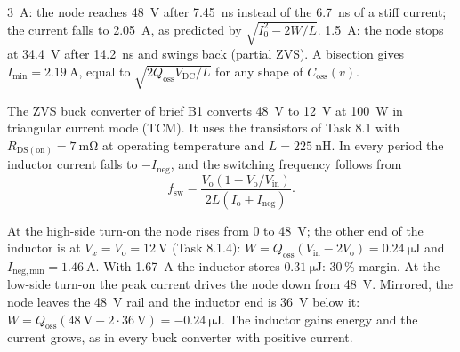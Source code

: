 \begin{solutionblock}
	\SI{3}{\ampere}: the node reaches \SI{48}{\volt} after \SI{7.45}{\nano\second} instead of the \SI{6.7}{\nano\second} of a stiff current; the current falls to \SI{2.05}{\ampere}, as predicted by $\sqrt{I_0^2-2W/L}$. \SI{1.5}{\ampere}: the node stops at \SI{34.4}{\volt} after \SI{14.2}{\nano\second} and swings back (partial ZVS). A bisection gives $I_\mathrm{min}=\SI{2.19}{\ampere}$, equal to $\sqrt{2Q_\mathrm{oss}V_\mathrm{DC}/L}$ for any shape of $C_\mathrm{oss}(v)$.
\end{solutionblock}



The ZVS buck converter of brief B1 converts \SI{48}{\volt} to \SI{12}{\volt} at \SI{100}{\watt} in triangular current mode (TCM). It uses the transistors of Task 8.1 with $R_\mathrm{DS(on)}=\SI{7}{\milli\ohm}$ at operating temperature and $L=\SI{225}{\nano\henry}$. In every period the inductor current falls to $-I_\mathrm{neg}$, and the switching frequency follows from
\begin{equation}
	f_\mathrm{sw}=\frac{V_\mathrm{o}\left(1-V_\mathrm{o}/V_\mathrm{in}\right)}{2L\left(I_\mathrm{o}+I_\mathrm{neg}\right)}.
\end{equation}


\begin{solutionblock}
	At the high-side turn-on the node rises from 0 to \SI{48}{\volt}; the other end of the inductor is at $V_x=V_\mathrm{o}=\SI{12}{\volt}$ (Task 8.1.4): $W=Q_\mathrm{oss}(V_\mathrm{in}-2V_\mathrm{o})=\SI{0.24}{\micro\joule}$ and $I_\mathrm{neg,min}=\SI{1.46}{\ampere}$. With \SI{1.67}{\ampere} the inductor stores $\SI{0.31}{\micro\joule}$: 30\,\% margin.
	At the low-side turn-on the peak current drives the node down from \SI{48}{\volt}. Mirrored, the node leaves the \SI{48}{\volt} rail and the inductor end is \SI{36}{\volt} below it: $W=Q_\mathrm{oss}(\SI{48}{\volt}-2\cdot\SI{36}{\volt})=\SI{-0.24}{\micro\joule}$. The inductor gains energy and the current grows, as in every buck converter with positive current.
\end{solutionblock}

